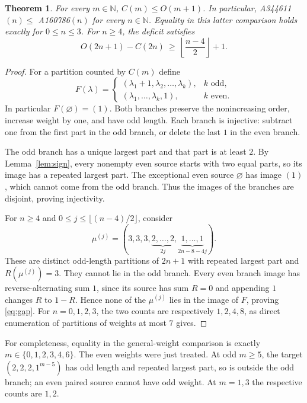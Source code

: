 \documentclass[11pt]{article}
\newtheorem{theorem}{Theorem}
\newcommand{\NN}{\mathbb N}
\begin{document}
\begin{theorem}\label{thm:main}
For every $m\in\NN$, $C(m)\le O(m+1)$.
In particular, A344611$(n)\le$ A160786$(n)$ for every $n\in\NN$.
Equality in this latter comparison holds exactly for $0\le n\le3$.
For $n\ge4$, the deficit satisfies
\begin{equation}\label{eq:gap}
 O(2n+1)-C(2n)\ \ge\ \left\lfloor\frac{n-4}{2}\right\rfloor+1.
\end{equation}
\end{theorem}
\begin{proof}
For a partition counted by $C(m)$ define
\[
 F(\lambda)=
 \begin{cases}
 (\lambda_1+1,\lambda_2,\ldots,\lambda_k),&k\text{ odd},\\
 (\lambda_1,\ldots,\lambda_k,1),&k\text{ even}.
 \end{cases}
\]
In particular $F(\varnothing)=(1)$. Both branches preserve the
nonincreasing order, increase weight by one, and have odd length.
Each branch is injective: subtract one from the first part in the
odd branch, or delete the last $1$ in the even branch.

The odd branch has a unique largest part and that part is at least $2$.
By Lemma~\ref{lem:sign}, every nonempty even source starts with two equal
parts, so its image has a repeated largest part. The exceptional even
source $\varnothing$ has image $(1)$, which cannot come from the odd
branch. Thus the images of the branches are disjoint, proving injectivity.

For $n\ge4$ and $0\le j\le\lfloor(n-4)/2\rfloor$, consider
\[
 \mu^{(j)}=(3,3,3,\underbrace{2,\ldots,2}_{2j},
                   \underbrace{1,\ldots,1}_{2n-8-4j}).
\]
These are distinct odd-length partitions of $2n+1$ with repeated largest
part and $R(\mu^{(j)})=3$. They cannot lie in the odd branch. Every even
branch image has reverse-alternating sum $1$, since its source has sum
$R=0$ and appending $1$ changes $R$ to $1-R$. Hence none of the
$\mu^{(j)}$ lies in the image of $F$, proving \eqref{eq:gap}.
For $n=0,1,2,3$, the two counts are respectively $1,2,4,8$,
as direct enumeration of partitions of weights at most $7$ gives.
\end{proof}

For completeness, equality in the general-weight comparison is exactly
$m\in\{0,1,2,3,4,6\}$. The even weights were just treated. At odd
$m\ge5$, the target $(2,2,2,1^{m-5})$ has odd length and repeated
largest part, so is outside the odd branch; an even paired source
cannot have odd weight. At $m=1,3$ the respective counts are $1,2$.
\end{document}
